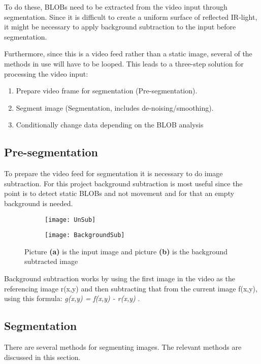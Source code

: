 To do these, BLOBs need to be extracted from the video input through segmentation. Since it is difficult to create a uniform surface of reflected IR-light, it might be necessary to apply background subtraction to the input before segmentation. 

Furthermore, since this is a video feed rather than a static image, several of the methods in use will have to be looped. This leads to a three-step solution for processing the video input:

\begin{enumerate}
\item Prepare video frame for segmentation (Pre-segmentation).
\item Segment image (Segmentation, includes de-noising/smoothing).
\item Conditionally change data depending on the BLOB analysis
\end{enumerate}

\subsection{Pre-segmentation}
To prepare the video feed for segmentation it is necessary to do image subtraction. For this project background subtraction is most useful since the point is to detect static BLOBs and not movement and for that an empty background is needed. 

\begin{figure}
	\centering
	\begin{subfigure}[b]{0.3\textwidth}
	\texttt{[image: UnSub]}
		\caption{\label{Fig:UnSub}}
	\end{subfigure}
	\begin{subfigure}[b]{0.3\textwidth}
	\texttt{[image: BackgroundSub]}
		\caption{\label{Fig:BackgroundSub}}
	\end{subfigure}
	\caption{Picture \textbf{(a)} is the input image and picture \textbf{(b)} is the background subtracted image\label{Fig:Subtract}}
\end{figure}

Background subtraction works by using the first image in the video as the referencing image r(x,y) and then subtracting that from the current image f(x,y), using this formula: \textit{g(x,y) = f(x,y) - r(x,y)} \citep{moeslund_introduction_2012}. 

\subsection{Segmentation}
There are several methods for segmenting images. The relevant methods are discussed in this section. 

